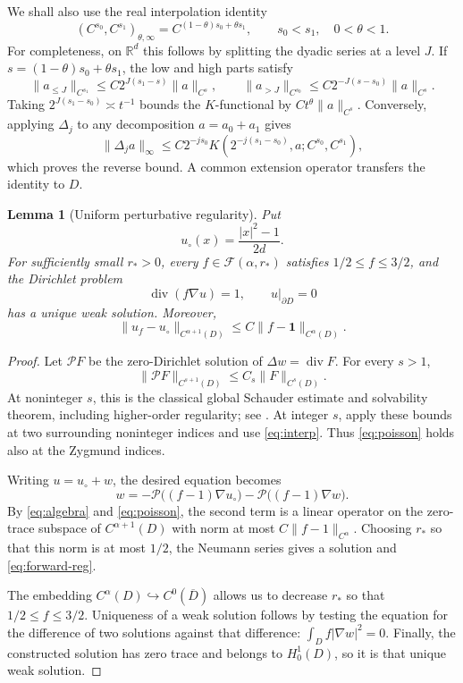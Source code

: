 \documentclass[11pt]{article}
\newtheorem{lemma}[theorem]{Lemma}
\theoremstyle{remark}
\newcommand{\R}{\mathbb R}
\newcommand{\one}{\mathbf 1}
\newcommand{\cF}{\mathcal F}
\DeclareMathOperator{\divergence}{div}
\begin{document}
We shall also use the real interpolation identity
\begin{equation}\label{eq:interp}
(C^{s_0},C^{s_1})_{\theta,\infty}
=C^{(1-\theta)s_0+\theta s_1},
\qquad s_0<s_1,\quad 0<\theta<1.
\end{equation}
For completeness, on \(\R^d\) this follows by splitting the dyadic
series at a level \(J\). If \(s=(1-\theta)s_0+\theta s_1\), the low
and high parts satisfy
\[
\|a_{\leq J}\|_{C^{s_1}}
\leq C2^{J(s_1-s)}\|a\|_{C^s},\qquad
\|a_{>J}\|_{C^{s_0}}
\leq C2^{-J(s-s_0)}\|a\|_{C^s}.
\]
Taking \(2^{J(s_1-s_0)}\asymp t^{-1}\) bounds the \(K\)-functional
by \(Ct^\theta\|a\|_{C^s}\). Conversely, applying \(\Delta_j\) to
any decomposition \(a=a_0+a_1\) gives
\[
\|\Delta_j a\|_\infty
\leq C2^{-js_0}
K(2^{-j(s_1-s_0)},a;C^{s_0},C^{s_1}),
\]
which proves the reverse bound. A common extension operator transfers
the identity to \(D\).

\begin{lemma}[Uniform perturbative regularity]\label{lem:forward}
Put
\[
u_\circ(x)=\frac{|x|^2-1}{2d}.
\]
For sufficiently small \(r_*>0\), every
\(f\in\cF(\alpha,r_*)\) satisfies \(1/2\leq f\leq3/2\), and the
Dirichlet problem
\[
\divergence(f\nabla u)=1,\qquad u|_{\partial D}=0
\]
has a unique weak solution. Moreover,
\begin{equation}\label{eq:forward-reg}
\|u_f-u_\circ\|_{C^{\alpha+1}(D)}
\leq C\|f-\one\|_{C^\alpha(D)}.
\end{equation}
\end{lemma}

\begin{proof}
Let \(\mathcal P F\) be the zero-Dirichlet solution of
\(\Delta w=\divergence F\). For every \(s>1\),
\begin{equation}\label{eq:poisson}
\|\mathcal P F\|_{C^{s+1}(D)}
\leq C_s\|F\|_{C^s(D)}.
\end{equation}
At noninteger \(s\), this is the classical global Schauder estimate
and solvability theorem, including higher-order regularity; see
\cite[Theorems~6.6, 6.14 and 6.19]{GT}.
At integer \(s\), apply these bounds at two surrounding noninteger
indices and use \eqref{eq:interp}. Thus \eqref{eq:poisson} holds
also at the Zygmund indices.

Writing \(u=u_\circ+w\), the desired equation becomes
\[
w=-\mathcal P\big((f-1)\nabla u_\circ\big)
  -\mathcal P\big((f-1)\nabla w\big).
\]
By \eqref{eq:algebra} and \eqref{eq:poisson}, the second term is a
linear operator on the zero-trace subspace of \(C^{\alpha+1}(D)\)
with norm at most \(C\|f-1\|_{C^\alpha}\). Choosing \(r_*\) so that
this norm is at most \(1/2\), the Neumann series gives a solution
and \eqref{eq:forward-reg}.

The embedding \(C^\alpha(D)\hookrightarrow C^0(\overline D)\)
allows us to decrease \(r_*\) so that \(1/2\leq f\leq3/2\).
Uniqueness of a weak solution follows by testing the equation for
the difference of two solutions against that difference:
\(\int_D f|\nabla w|^2=0\). Finally, the constructed solution has
zero trace and belongs to \(H^1_0(D)\), so it is that unique weak
solution.
\end{proof}
\end{document}
